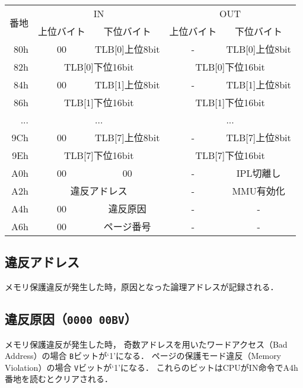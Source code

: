 \begin{center}
  \small\begin{tabular}{| r | c | c || c | c |}\hline
    \multirow{2}{*}{番地}
    & \multicolumn{2}{c||}{IN}
    & \multicolumn{2}{c|}{OUT}
    \\\cline{2-5}
         & 上位バイト & 下位バイト & 上位バイト & 下位バイト
    \\\hline\hline
    80h  & 00 & TLB[0]上位8bit & - & TLB[0]上位8bit \\\hline
    82h  & \multicolumn{2}{c||}{TLB[0]下位16bit}
         & \multicolumn{2}{c|}{TLB[0]下位16bit} \\\hline
    84h  & 00 & TLB[1]上位8bit & - & TLB[1]上位8bit \\\hline
    86h  & \multicolumn{2}{c||}{TLB[1]下位16bit}
         & \multicolumn{2}{c|}{TLB[1]下位16bit} \\\hline
    ...  & \multicolumn{2}{c||}{...}
         & \multicolumn{2}{c|}{...}   \\\hline
    9Ch  & 00 & TLB[7]上位8bit & - & TLB[7]上位8bit \\\hline
    9Eh  & \multicolumn{2}{c||}{TLB[7]下位16bit}
         & \multicolumn{2}{c|}{TLB[7]下位16bit} \\\hline
    A0h  &  00 & 00
         &  -  & IPL切離し \\\hline
    A2h  &  \multicolumn{2}{c||}{違反アドレス}
         &  -  & MMU有効化 \\\hline
    A4h  &  00 & 違反原因
         &  -  & - \\\hline
    A6h  &  00 & ページ番号
         &  -  & - \\\hline
  \end{tabular}
\end{center}

\subsection{違反アドレス}
  メモリ保護違反が発生した時，原因となった論理アドレスが記録される．

\subsection{違反原因（\texttt{0000 00BV}）}
  メモリ保護違反が発生した時，
  奇数アドレスを用いたワードアクセス（Bad Address）の場合
  \texttt{B}ビットが`1'になる．
  ページの保護モード違反（Memory Violation）の場合
  \texttt{V}ビットが`1'になる．
  これらのビットはCPUがIN命令でA4h番地を読むとクリアされる．

